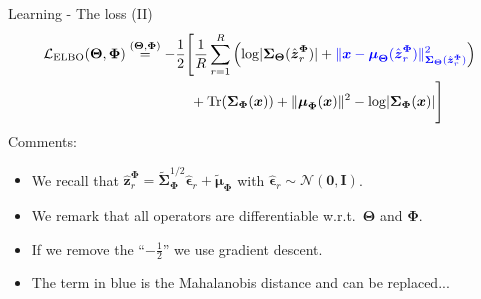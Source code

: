 \documentclass{beamer}
\newcommand{\MN}{{\mathcal N}}
\newcommand{\bs}[1]{\boldsymbol{#1}}
\begin{document}
\begin{frame}{Learning - The loss (II)}
 \begin{align}
 \mathcal{L}_{\text{ELBO}}(\bs{\Theta},\bs{\Phi}) &\stackrel{(\bs{\Theta},\bs{\Phi})}{=} -\frac{1}{2}\Bigg[\frac{1}{R}\sum_{r=1}^R \left(\log \lvert \bs{\Sigma}_{\bs{\Theta}}(\hat{\bs{z}}_r^{\bs{\Phi}})\rvert + {\color{blue}\lVert \bs{x}-\bs{\mu}_{\bs{\Theta}}(\hat{\bs{z}}_r^{\bs{\Phi}})\rVert^2_{\bs{\Sigma}_{\bs{\Theta}}(\hat{\bs{z}}_r^{\bs{\Phi}})}}\right)\\
 &\phantom{\stackrel{(\bs{\Theta},\bs{\Phi})}{=} -\frac{1}{2}\Bigg[}+\textrm{Tr}(\bs{\Sigma}_{\bs{\Phi}}(\bs{x})) + \lVert\bs{\mu}_{\bs{\Phi}}(\bs{x})\rVert^2 - \log \lvert\bs{\Sigma}_{\bs{\Phi}}(\bs{x})\rvert\Bigg]
\end{align}
Comments:
\begin{itemize}
 \item We recall that $ \hat{\bs{z}}_r^{\bs{\Phi}} = \tilde{\bs{\Sigma}}_{\bs{\Phi}}^{1/2}\hat{\bs{\epsilon}}_r + \tilde{\bs{\mu}}_{\bs{\Phi}} $ with $\hat{\bs{\epsilon}}_r\sim \MN(\bs{0},\bs{I})$.
 \item We remark that all operators are differentiable w.r.t.\ $\bs{\Theta}$ and $\bs{\Phi}$.
 \item If we remove the ``$-\frac{1}{2}$'' we use gradient descent.
 \item The term in blue is the {\color{blue}Mahalanobis distance} and can be replaced...
\end{itemize}

\end{frame}
\end{document}
